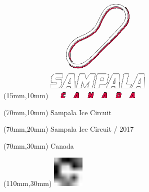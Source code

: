 \null\newpage
\begin{textblock*}{50mm}(15mm,10mm)%
\includegraphics[width=50mm]{LG/SAM.png}
\end{textblock*}
\begin{textblock*}{130mm}(70mm,10mm)%
{\fontsize{20}{20}\selectfont Sampala Ice Circuit}\\
\end{textblock*}
\begin{textblock*}{120mm}(70mm,20mm)%
{\fontsize{16}{16}\selectfont Sampala Ice Circuit / 2017}\\
\end{textblock*}
\begin{textblock*}{120mm}(70mm,30mm)%
{\fontsize{12}{12}\selectfont Canada}
\end{textblock*}
\begin{textblock*}{30mm}(110mm,30mm)%
\centering
\includegraphics[height=15mm]{icons/fa-rotate-right.pdf}
\end{textblock*}
